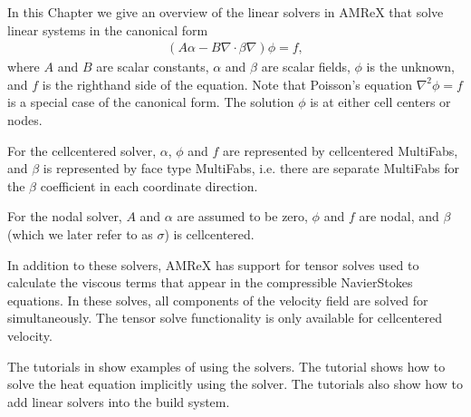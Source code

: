 \documentclass[letterpaper,10pt,english]{sphinxmanual}
\begin{document}
\sphinxAtStartPar
In this Chapter we give an overview of the linear solvers in AMReX
that solve linear systems in the canonical form
\begin{equation}\label{equation:LinearSolvers_Chapter:eqn::abeclap}
\begin{split}(A \alpha - B \nabla \cdot \beta \nabla ) \phi = f,\end{split}
\end{equation}
\sphinxAtStartPar
where \(A\) and \(B\) are scalar constants,
\(\alpha\) and \(\beta\) are scalar fields,
\(\phi\) is the unknown,
and \(f\) is the right\sphinxhyphen{}hand side of the equation.  Note
that Poisson’s equation \(\nabla^2 \phi = f\) is a special case
of the canonical form.  The solution \(\phi\) is at either
cell centers or nodes.

\sphinxAtStartPar
For the cell\sphinxhyphen{}centered solver, \(\alpha\), \(\phi\) and \(f\)
are represented by cell\sphinxhyphen{}centered MultiFabs,
and \(\beta\) is represented by  face type
MultiFabs, i.e.  there are separate MultiFabs for the \(\beta\)
coefficient in each coordinate direction.

\sphinxAtStartPar
For the nodal solver, \(A\) and \(\alpha\) are assumed to be zero,
\(\phi\) and \(f\) are nodal,
and \(\beta\) (which we later refer to as \(\sigma\)) is cell\sphinxhyphen{}centered.

\sphinxAtStartPar
In addition to these solvers, AMReX has support for tensor solves used
to calculate the viscous terms that appear in the compressible Navier\sphinxhyphen{}Stokes
equations.  In these solves, all components of the velocity field are solved
for simultaneously.  The tensor solve functionality is only available for
cell\sphinxhyphen{}centered velocity.

\sphinxAtStartPar
The tutorials in  show examples of
using the solvers.  The tutorial
 shows how to solve the
heat equation implicitly using the solver.  The tutorials also show
how to add linear solvers into the build system.
\end{document}
